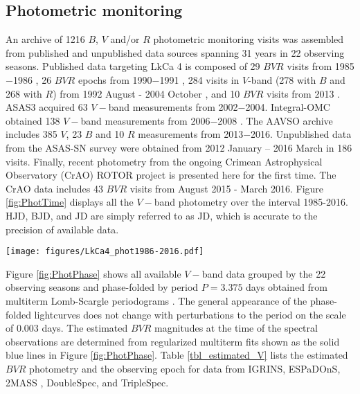 \documentclass[12pt]{report}
\newcommand{\name}{LkCa 4 }
\begin{document}
\subsection{Photometric monitoring}

An archive of 1216 $B$, $V$ and/or $R$ photometric monitoring visits was assembled from published and unpublished data sources spanning 31 years in 22 observing seasons.  Published data targeting \name is composed of 29 $BVR$ visits from 1985$-$1986 \citep{vrba93}, 26 $BVR$ epochs from 1990$-$1991 \citep{bouvier93}, 284 visits in $V$-band (278 with $B$ and 268 with $R$) from 1992 August - 2004 October \citep{grankin08}, and 10 $BVR$ visits from 2013 \citep{donati14}.  ASAS3 \citep{pojmanski04} acquired 63 $V-$band measurements from 2002$-$2004.  Integral-OMC obtained 138 $V-$band measurements from 2006$-$2008 \citep{garzon12}.  The AAVSO archive \citep{kafka16} includes 385 $V$, 23 $B$ and 10 $R$ measurements from 2013$-$2016.  Unpublished data from the ASAS-SN survey \citep{shappee14} were obtained from 2012 January -- 2016 March in 186 visits.  Finally, recent photometry from the ongoing Crimean Astrophysical Observatory (CrAO) ROTOR project \citep{grankin08} is presented here for the first time.  The CrAO data includes 43 $BVR$ visits from August 2015 - March 2016. Figure \ref{fig:PhotTime} displays all the $V-$band photometry over the interval 1985-2016.  HJD, BJD, and JD are simply referred to as JD, which is accurate to the precision of available data.


\begin{figure*}
 \centering
 \texttt{[image: figures/LkCa4\_phot1986-2016.pdf]}
 \caption[Overview of LkCa 4 $V-$band photometric monitoring from 1986$-$2016]{Overview of LkCa 4 $V-$band photometric monitoring from 1986$-$2016.  The vertical lines denote the observing epochs of 2MASS, IGRINS, ESPaDOnS, DoubleSpec, and TripleSpec.  The near contemporaneous DoubleSpec and TripleSpec epochs lay on top of each other on this scale, as do the 12 ESPaDOnS epochs.  The abscissa range is equal to the current lifespan of the first author of this paper.}
 \label{fig:PhotTime}
\end{figure*}

Figure \ref{fig:PhotPhase} shows all available $V-$band data grouped by the 22 observing seasons and phase-folded by period $P=3.375$ days obtained from multiterm Lomb-Scargle periodograms \citep{ivezic14}.  The general appearance of the phase-folded lightcurves does not change with perturbations to the period on the scale of 0.003 days.  The estimated $BVR$ magnitudes at the time of the spectral observations are determined from regularized multiterm fits \citep{vanderplas15a} shown as the solid blue lines in Figure \ref{fig:PhotPhase}.  Table \ref{tbl_estimated_V} lists the estimated $BVR$ photometry and the observing epoch for data from IGRINS, ESPaDOnS, 2MASS \citep{skrutskie06}, DoubleSpec, and TripleSpec.  
\end{document}
